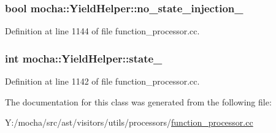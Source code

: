 \hypertarget{classmocha_1_1_yield_helper_a454e09b29dc21bcbb4779db83a053a60}{
\subsubsection[{no\_\-state\_\-injection\_\-}]{\setlength{\rightskip}{0pt plus 5cm}bool {\bf mocha::YieldHelper::no\_\-state\_\-injection\_\-}}}
\label{classmocha_1_1_yield_helper_a454e09b29dc21bcbb4779db83a053a60}


Definition at line 1144 of file function\_\-processor.cc.

\hypertarget{classmocha_1_1_yield_helper_af18a7f0c42d4d40e975c10cdd79aa0ad}{
\subsubsection[{state\_\-}]{\setlength{\rightskip}{0pt plus 5cm}int {\bf mocha::YieldHelper::state\_\-}}}
\label{classmocha_1_1_yield_helper_af18a7f0c42d4d40e975c10cdd79aa0ad}


Definition at line 1142 of file function\_\-processor.cc.



The documentation for this class was generated from the following file:\begin{DoxyCompactItemize}
\item 
Y:/mocha/src/ast/visitors/utils/processors/\hyperlink{function__processor_8cc}{function\_\-processor.cc}\end{DoxyCompactItemize}
